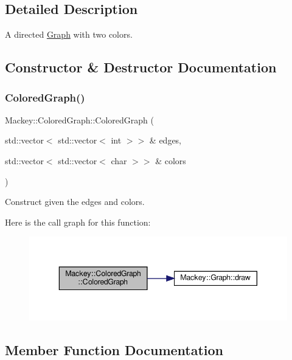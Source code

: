 \subsection{Detailed Description}
A directed \hyperlink{classMackey_1_1Graph}{Graph} with two colors. 

\subsection{Constructor \& Destructor Documentation}
\mbox{\label{classMackey_1_1ColoredGraph_adada856cdbfc508b2df15919f45a1808}} 
\subsubsection{\texorpdfstring{Colored\+Graph()}{ColoredGraph()}}
{\footnotesize\ttfamily Mackey\+::\+Colored\+Graph\+::\+Colored\+Graph (\begin{DoxyParamCaption}\item[{std\+::vector$<$ std\+::vector$<$ int $>$$>$ \&}]{edges,  }\item[{std\+::vector$<$ std\+::vector$<$ char $>$$>$ \&}]{colors }\end{DoxyParamCaption})\hspace{0.3cm}{\ttfamily [inline]}}



Construct given the edges and colors. 

Here is the call graph for this function\+:\nopagebreak
\begin{figure}[H]
\begin{center}
\leavevmode
\includegraphics[width=343pt]{classMackey_1_1ColoredGraph_adada856cdbfc508b2df15919f45a1808_cgraph}
\end{center}
\end{figure}


\subsection{Member Function Documentation}
\mbox{\label{classMackey_1_1ColoredGraph_a8ed05073805b34a0087a7ed94e889694}} 
